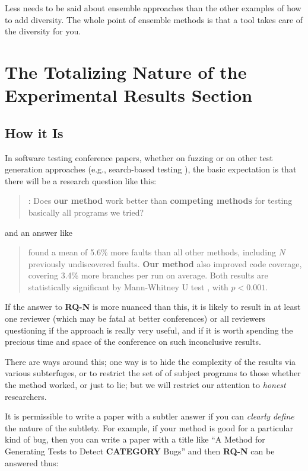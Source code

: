 \documentclass[sigplan,review]{acmart}
\begin{document}
Less needs to be said about ensemble approaches than the other
examples of how to add diversity.  The whole point of ensemble methods
is that a tool takes care of the diversity for you.

\section{The Totalizing Nature of the Experimental Results Section}

\subsection{How it Is}

In software testing conference papers, whether on fuzzing or on other test
generation approaches (e.g., search-based testing \cite{McMinn04search-basedsoftware}), the basic
expectation is that there will be a research question like this:

\begin{quote}
:  Does {\bf our method} work better than {\bf competing
  methods} for testing basically all programs we tried?
\end{quote}

\noindent and an answer like

\begin{quote}
 found a mean of 5.6\% more faults than all
other methods, including $N$ previously undiscovered faults.  {\bf Our
  method} also improved code coverage, covering 3.4\% more branches
per run on average.  Both results are statistically significant by
Mann-Whitney U test \cite{arcuri2014hitchhiker}, with $p < 0.001$.
\end{quote}

If the answer to {\bf RQ-N} is more nuanced than this, it is likely to result in
at least one reviewer (which may be fatal at better conferences) or
all reviewers questioning if the approach is really very useful, and
if it is worth spending the precious time and space of the conference
on such inconclusive results.

There are ways around this; one way is to hide the complexity of the
results via various subterfuges, or to restrict the set of of subject
programs to those whether the method worked, or just to lie; but we
will restrict our attention to \emph{honest} researchers.

It is permissible to write a paper with a subtler answer if you can
\emph{clearly define} the nature of the subtlety.  For example, if
your method is good for a particular kind of bug, then you can write a
paper with a title like ``A Method for Generating Tests to Detect {\bf
  CATEGORY} Bugs'' and then {\bf RQ-N} can be answered thus:
\end{document}
